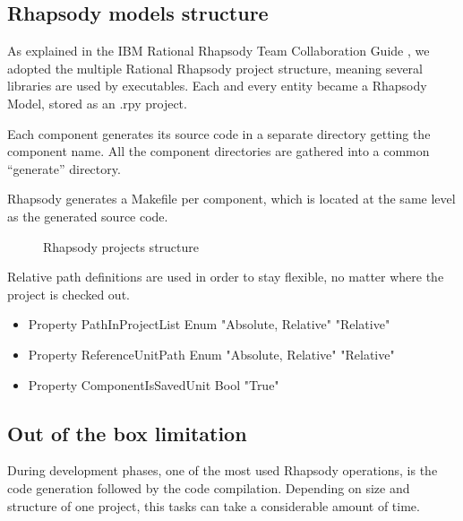 \documentclass[dvips]{imsart}
\begin{document}
\subsection{Rhapsody models structure}
As explained in the IBM Rational Rhapsody Team Collaboration Guide
\cite{RhpTeamColla-09}, we adopted the multiple Rational Rhapsody project
structure, meaning several libraries are used by executables. Each and every
entity became a Rhapsody Model, stored as an .rpy project.

Each component generates its source code in a separate directory getting the
component name. All the component directories are gathered into a common
``generate'' directory.

Rhapsody generates a Makefile per component, which is located at the same level
as the generated source code.

\label{ProjStruct}
\begin{figure}[ht]
\centering
 \caption{Rhapsody projects structure}
 \label{fig:projStruct}
\end{figure}

Relative path definitions are used in order to stay flexible, no matter where
the project is checked out.
\begin{itemize}
    \item Property PathInProjectList Enum "Absolute, Relative" "Relative"
    \item Property ReferenceUnitPath Enum "Absolute, Relative" "Relative"
    \item Property ComponentIsSavedUnit    Bool    "True"
\end{itemize}

\subsection{Out of the box limitation}
During development phases, one of the most used Rhapsody operations, is the
code generation followed by the code compilation. Depending on size and
structure of one project, this tasks can take a considerable amount of time.
\end{document}
